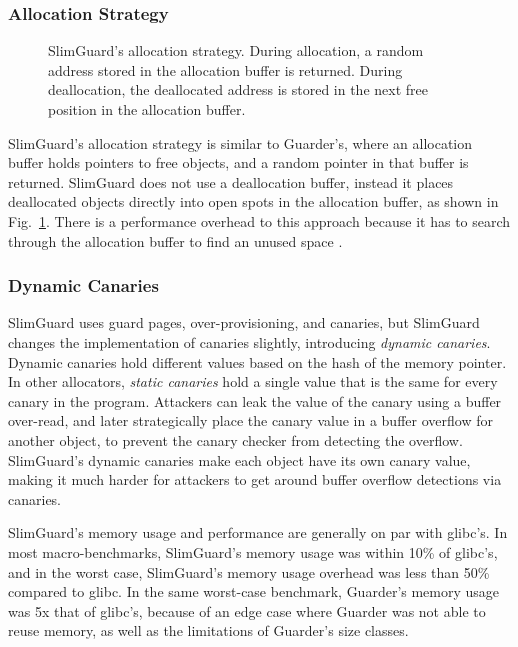 \documentclass[conference]{IEEEtran}
\begin{document}
\subsubsection{Allocation Strategy}

\begin{figure}
	\def\svgwidth{3.5in}
	
	\caption{
		SlimGuard's allocation strategy.
		During allocation, a random address stored in the allocation buffer is returned.
		During deallocation, the deallocated address is stored in the next free position in the allocation buffer.
		\label{fig:slimguard_allocation}}
\end{figure}


SlimGuard's allocation strategy is similar to Guarder's, where an allocation buffer holds pointers to free objects, and a random pointer in that buffer is returned.
SlimGuard does not use a deallocation buffer, instead it places deallocated objects directly into open spots in the allocation buffer, as shown in Fig.~\ref{fig:slimguard_allocation}.
There is a performance overhead to this approach because it has to search through the allocation buffer to find an unused space \cite{guarder}.

\subsubsection{Dynamic Canaries}
SlimGuard uses guard pages, over-provisioning, and canaries, but SlimGuard changes the implementation of canaries slightly, introducing \emph{dynamic canaries}.
Dynamic canaries hold different values based on the hash of the memory pointer.
In other allocators, \emph{static canaries} hold a single value that is the same for every canary in the program.
Attackers can leak the value of the canary using a buffer over-read, and later strategically place the canary value in a buffer overflow for another object, to prevent the canary checker from detecting the overflow.
SlimGuard's dynamic canaries make each object have its own canary value, making it much harder for attackers to get around buffer overflow detections via canaries.

SlimGuard's memory usage and performance are generally on par with glibc's.
In most macro-benchmarks, SlimGuard's memory usage was within 10\% of glibc's, and in the worst case, SlimGuard's memory usage overhead was less than 50\% compared to glibc.
In the same worst-case benchmark, Guarder's memory usage was 5x that of glibc's, because of an edge case where Guarder was not able to reuse memory, as well as the limitations of Guarder's size classes.
\end{document}

